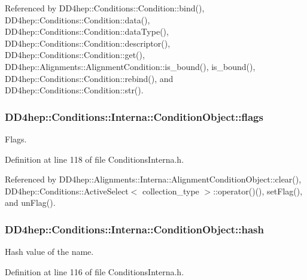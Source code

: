 Referenced by DD4hep::Conditions::Condition::bind(), DD4hep::Conditions::Condition::data(), DD4hep::Conditions::Condition::dataType(), DD4hep::Conditions::Condition::descriptor(), DD4hep::Conditions::Condition::get(), DD4hep::Alignments::AlignmentCondition::is\_\-bound(), is\_\-bound(), DD4hep::Conditions::Condition::rebind(), and DD4hep::Conditions::Condition::str().\hypertarget{class_d_d4hep_1_1_conditions_1_1_interna_1_1_condition_object_ad6e3e4fed5b13ddc85577d1fe5f3fcfd}{
\subsubsection[{flags}]{ {\bf DD4hep::Conditions::Interna::ConditionObject::flags}}}
\label{class_d_d4hep_1_1_conditions_1_1_interna_1_1_condition_object_ad6e3e4fed5b13ddc85577d1fe5f3fcfd}


Flags. 

Definition at line 118 of file ConditionsInterna.h.

Referenced by DD4hep::Alignments::Interna::AlignmentConditionObject::clear(), DD4hep::Conditions::ActiveSelect$<$ collection\_\-type $>$::operator()(), setFlag(), and unFlag().\hypertarget{class_d_d4hep_1_1_conditions_1_1_interna_1_1_condition_object_a6333e2a00c29743a1d64a26356714024}{
\subsubsection[{hash}]{ {\bf DD4hep::Conditions::Interna::ConditionObject::hash}}}
\label{class_d_d4hep_1_1_conditions_1_1_interna_1_1_condition_object_a6333e2a00c29743a1d64a26356714024}


Hash value of the name. 

Definition at line 116 of file ConditionsInterna.h.

